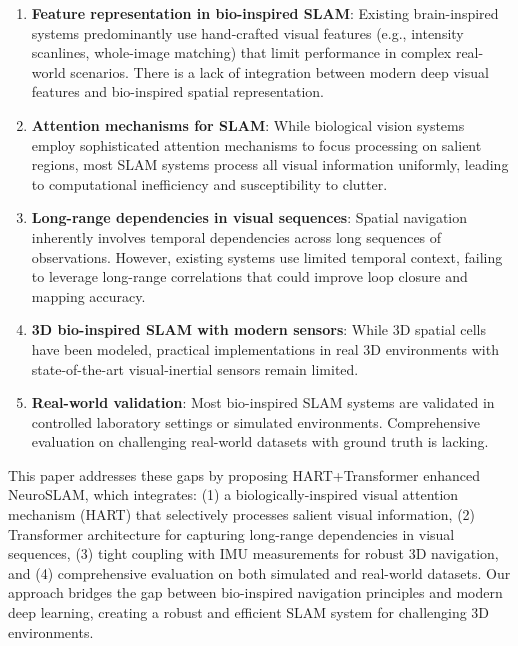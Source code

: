 \begin{enumerate}
    \item \textbf{Feature representation in bio-inspired SLAM}: Existing brain-inspired systems predominantly use hand-crafted visual features (e.g., intensity scanlines, whole-image matching) that limit performance in complex real-world scenarios. There is a lack of integration between modern deep visual features and bio-inspired spatial representation.
    
    \item \textbf{Attention mechanisms for SLAM}: While biological vision systems employ sophisticated attention mechanisms to focus processing on salient regions, most SLAM systems process all visual information uniformly, leading to computational inefficiency and susceptibility to clutter.
    
    \item \textbf{Long-range dependencies in visual sequences}: Spatial navigation inherently involves temporal dependencies across long sequences of observations. However, existing systems use limited temporal context, failing to leverage long-range correlations that could improve loop closure and mapping accuracy.
    
    \item \textbf{3D bio-inspired SLAM with modern sensors}: While 3D spatial cells have been modeled, practical implementations in real 3D environments with state-of-the-art visual-inertial sensors remain limited.
    
    \item \textbf{Real-world validation}: Most bio-inspired SLAM systems are validated in controlled laboratory settings or simulated environments. Comprehensive evaluation on challenging real-world datasets with ground truth is lacking.
\end{enumerate}

This paper addresses these gaps by proposing HART+Transformer enhanced NeuroSLAM, which integrates:
(1) a biologically-inspired visual attention mechanism (HART) that selectively processes salient visual information,
(2) Transformer architecture for capturing long-range dependencies in visual sequences,
(3) tight coupling with IMU measurements for robust 3D navigation, and
(4) comprehensive evaluation on both simulated and real-world datasets.
Our approach bridges the gap between bio-inspired navigation principles and modern deep learning, creating a robust and efficient SLAM system for challenging 3D environments.
